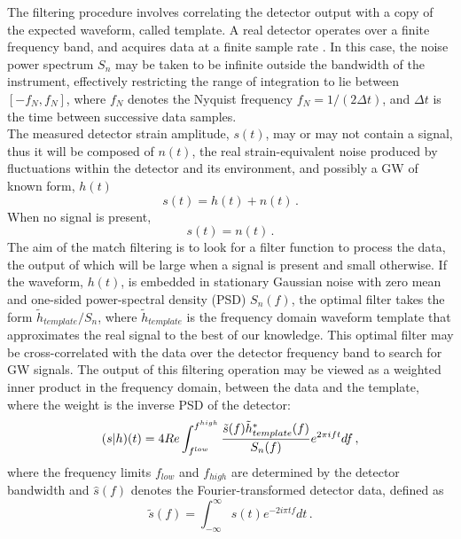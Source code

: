 \documentclass[binding=0.6cm, LaM]{sapthesis}
\begin{document}
	The filtering procedure involves correlating the detector output 
	with a copy of the expected waveform, 
	called template.
	A real detector operates over a finite frequency band, 
	and acquires data at a finite sample rate \cite{24}. 
	In this case, the noise power spectrum $S_n$ 
	may be taken to be infinite outside the bandwidth of the instrument, 
	effectively restricting the range of integration to lie between $[-f_N, f_N]$, 
	where $f_N$ denotes the Nyquist frequency $f_N = 1/(2\Delta t)$, 
	and $\Delta t$ is the time between successive data samples.   \\
	The measured detector strain amplitude, $s(t)$, may or may not contain a signal,
	thus it will be composed of $n(t)$, the real strain-equivalent noise
        produced by fluctuations within the detector and its environment, 
	and possibly a GW of known form, $h(t)$
                \begin{equation}
                        s(t) = h(t) + n(t)\,.
                \end{equation}
        When no signal is present,   		
		\begin{equation}
                        s(t) = n(t)\,.
                \end{equation}
        The aim of the match filtering is to look for a filter function to process the data,
	the output of which will be large when a signal is present and small otherwise. 
        If the waveform, $h(t)$, is embedded in stationary Gaussian noise with zero mean and one-sided power-spectral density (PSD) $S_n(f)$,
        the optimal filter takes the form $\tilde h_{template}/S_n$, where $\tilde h_{template}$
        is the frequency domain waveform template that approximates the real signal to the best of our knowledge.
	This optimal filter may be cross-correlated with the data over the detector frequency band to search for GW
        signals.  The output of this filtering operation may be viewed as a weighted inner product in the frequency domain, 
	between the data and the template, where the weight is the inverse PSD of the detector:
		\begin{equation}
 			(s|h)(t) = 4Re \int^{f^{high}}_{f^{low}} {{\tilde s (f) \tilde h^{*}_{template}(f)} \over {S_n (f)}} e^{2 \pi ift}df\,, 
		\end{equation}
	where the frequency limits $f_{low}$ and $f_{high}$ are determined by the detector bandwidth
	and $\hat s(f)$ denotes the Fourier-transformed detector data, defined as
		\begin{equation}
			\tilde s(f) = \int^{\infty}_{-\infty} s(t) e^{-2i \pi tf} dt\,.
		\end{equation}
  
\end{document}
